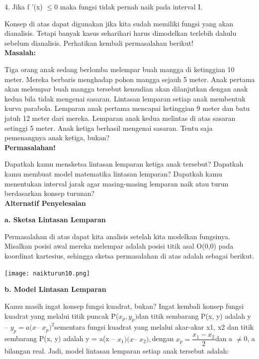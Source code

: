 \documentclass[11pt,fleqn]{book} %
\begin{document}
4. Jika f '(x) $\leqslant $0 maka fungsi tidak pernah naik pada interval I.

Konsep di atas dapat digunakan jika kita sudah memiliki fungsi yang akan dianalisis. Tetapi banyak kasus seharihari harus dimodelkan terlebih dahulu sebelum dianalisis. Perhatikan kembali permasalahan berikut!\\

\textbf{Masalah:}

Tiga orang anak sedang berlomba melempar buah mangga di ketinggian 10 meter. Mereka berbaris menghadap pohon mangga sejauh 5 meter. Anak pertama akan melempar buah mangga tersebut kemudian akan dilanjutkan dengan anak kedua bila tidak mengenai sasaran. Lintasan lemparan setiap anak membentuk kurva parabola. Lemparan anak pertama mencapai ketinggian 9 meter dan batu jatuh 12 meter dari mereka. Lemparan anak kedua melintas di atas sasaran setinggi 5 meter. Anak ketiga berhasil mengenai sasaran. Tentu saja pemenangnya anak ketiga, bukan?
\\

\textbf{Permasalahan!}

Dapatkah kamu mensketsa lintasan lemparan ketiga anak tersebut? Dapatkah kamu membuat model matematika lintasan lemparan? Dapatkah kamu menentukan interval jarak agar masing-masing lemparan naik atau turun berdasarkan konsep turunan?\\


\textbf{Alternatif Penyelesaian}

\textbf{a. Sketsa Lintasan Lemparan}

Permasalahan di atas dapat kita analisis setelah kita modelkan fungsinya. Misalkan posisi awal mereka melempar adalah posisi titik asal O(0,0) pada koordinat kartesius, sehingga sketsa permasalahan di atas adalah sebagai berikut.

\begin{center}
\texttt{[image: naikturun10.png]}
\end{center}

\textbf{b. Model Lintasan Lemparan}

Kamu masih ingat konsep fungsi kuadrat, bukan? Ingat
kembali konsep fungsi kuadrat yang melalui titik puncak
P($x_{p}, y_{p}) $dan titik sembarang P(x, y) adalah y – $y_{p} = a(x
$– $x_{p})^2 $sementara fungsi kuadrat yang melalui akar-akar x1,
x2 dan titik sembarang P(x, y) adalah y = a(x – $x_{1})(x $– $x_{2}),
$dengan $x_{p}= \dfrac{x_{1}-x_{2}}{2}
$dan a $\neq $0, a bilangan real. Jadi, model
lintasan lemparan setiap anak tersebut adalah:
\end{document}
